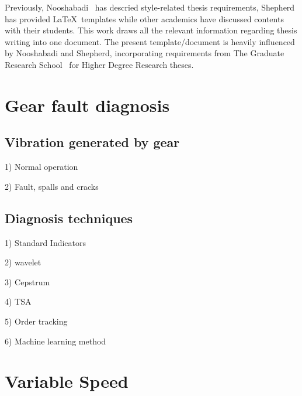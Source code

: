 Previously, Nooshabadi~\cite{pa} has descried style-related thesis
requirements, Shepherd~\cite{She05} has provided \LaTeX\ templates while
other academics have discussed contents with their students.  This work
draws all the relevant information regarding thesis writing into one
document.  The present template/document is heavily influenced by
Nooshabadi and Shepherd, incorporating requirements from The Graduate
Research School~\cite{GRS14} for Higher Degree Research theses.


\section{Gear fault diagnosis}

\subsection{Vibration generated by gear}

1)	Normal operation

2)	Fault, spalls and cracks

\subsection{Diagnosis techniques}

1)	Standard Indicators

2)	wavelet

3)	Cepstrum

4)	TSA

5)	Order tracking

6)	Machine learning method


\section{Variable Speed}